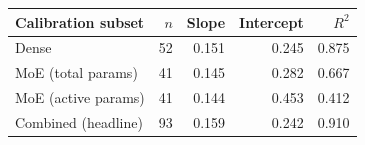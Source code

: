 \begin{tabular}{lrrrr}
\toprule
Calibration subset & $n$ & Slope & Intercept & $R^2$ \\
\midrule
Dense & 52 & 0.151 & 0.245 & 0.875 \\
MoE (total params) & 41 & 0.145 & 0.282 & 0.667 \\
MoE (active params) & 41 & 0.144 & 0.453 & 0.412 \\
Combined (headline) & 93 & 0.159 & 0.242 & 0.910 \\
\bottomrule
\end{tabular}
